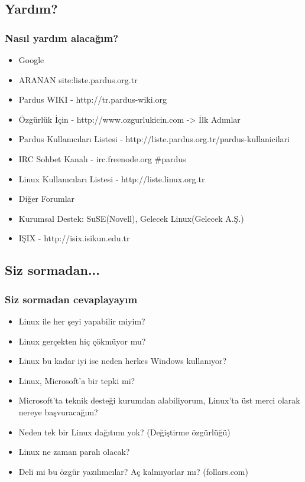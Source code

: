 \documentclass{beamer}
\begin{document}
	\subsection {Yardım?}
	\begin{frame}
		\frametitle{Nasıl yardım alacağım?}
		\begin{itemize}[<+->]
		 \item \color{brown}Google
		 \item \color{brown}ARANAN site:liste.pardus.org.tr
		 \item Pardus WIKI - http://tr.pardus-wiki.org
 		 \item Özgürlük İçin - http://www.ozgurlukicin.com -> İlk Adımlar
		 \item Pardus Kullanıcıları Listesi - http://liste.pardus.org.tr/pardus-kullanicilari
		 \item IRC Sohbet Kanalı - irc.freenode.org \#pardus
		 \item \color{black}Linux Kullanıcıları Listesi - http://liste.linux.org.tr
		 \item Diğer Forumlar
		 \item Kurumsal Destek: SuSE(Novell), Gelecek Linux(Gelecek A.Ş.)
		 \item \color{brown}IŞIX - http://isix.isikun.edu.tr 
			 
		\end{itemize}

	\end{frame}
	
	\subsection{Siz sormadan...}
	\begin{frame}
	 	\frametitle{Siz sormadan cevaplayayım}
		\begin{itemize}[<+->]
			\item Linux ile her şeyi yapabilir miyim?
			\item Linux gerçekten hiç çökmüyor mu?
			\item Linux bu kadar iyi ise neden herkes Windows kullanıyor?
			\item Linux, Microsoft'a bir tepki mi?
			\item Microsoft'ta teknik desteği kurumdan alabiliyorum, Linux'ta üst merci olarak nereye başvuracağım?
			\item Neden tek bir Linux dağıtımı yok? (Değiştirme özgürlüğü)
			\item Linux ne zaman paralı olacak?
			\item Deli mi bu özgür yazılımcılar? Aç kalmıyorlar mı? (follars.com)
		\end{itemize}

	\end{frame}
	
\end{document}
